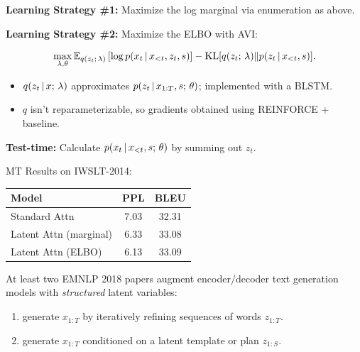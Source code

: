 \begin{frame}
\textbf{Learning Strategy \#1:} Maximize the log marginal via enumeration as above.

\air

\textbf{Learning Strategy \#2:} Maximize the ELBO with AVI:

\begin{align*}
    \max_{\lambda, \theta} \mathbb{E}_{q(z_t ; \, \lambda)} \left[ \log p(x_t \,|\, x_{<t}, z_t, s) \right] - \operatorname*{KL}[q(z_t ; \, \lambda) \Vert p(z_t \,|\, x_{<t}, s)].
\end{align*}

\air

\begin{itemize}
    \item $q(z_t \,|\, x ; \, \lambda)$ approximates $p(z_t \,|\, x_{1:T}, s ; \, \theta)$; implemented with a BLSTM.
    \item $q$ isn't reparameterizable, so gradients obtained using REINFORCE + baseline.
\end{itemize}

\end{frame}


\begin{frame}
\textbf{Test-time:} Calculate $p(x_t \,|\, x_{<t}, s ; \, \theta)$ by summing out $z_t$.

\air
\air
MT Results on IWSLT-2014:
\begin{table}
\begin{tabular}{lcc}
\toprule
     Model & PPL & BLEU\\
\midrule     
     Standard Attn & 7.03 & 32.31 \\
     Latent Attn (marginal) & 6.33 & 33.08 \\ 
     Latent Attn (ELBO) & 6.13 & 33.09 \\
\bottomrule
\end{tabular}
\end{table}
\end{frame}

\begin{frame}
At least two EMNLP 2018 papers augment encoder/decoder text generation models with \textit{structured} latent variables:

\begin{enumerate}
    \item \citet{lee2018deterministic} generate $x_{1:T}$ by iteratively refining sequences of words $z_{1:T}$.
    \air
    \air 
    \item \citet{wiseman2018learning} generate $x_{1:T}$ conditioned on a latent template or plan $z_{1:S}$.
\end{enumerate}
    
\end{frame}

